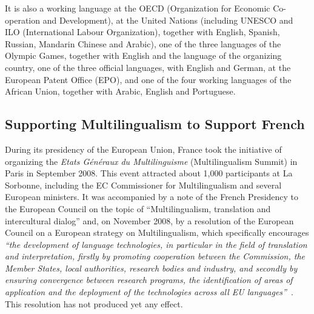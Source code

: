 \begin{multicols}{2}
It is also a working language at the OECD (Organization for Economic
Co-operation and Development), at the United Nations (including UNESCO
and ILO (International Labour Organization), together with English,
Spanish, Russian, Mandarin Chinese and Arabic), one of the three
languages of the Olympic Games, together with English and the language
of the organizing country, one of the three official languages, with
English and German, at the European Patent Office (EPO), and one of
the four working languages of the African Union, together with Arabic,
English and Portuguese.

\subsection{Supporting Multilingualism to Support French}

During its presidency of the European Union, France took the
initiative of organizing the {\em Etats Généraux du Multilinguisme}
(Multilingualism Summit) in Paris in September 2008. This event
attracted about 1,000 participants at La Sorbonne, including the EC
Commissioner for Multilingualism and several European ministers. It
was accompanied by a note of the French Presidency to the European
Council on the topic of ``Multilingualism, translation and
intercultural dialog'' and, on November 2008, by a
resolution of the European Council on a European strategy on
Multilingualism, which specifically encourages {\em ``the development
  of language technologies, in particular in the field of translation
  and interpretation, firstly by promoting cooperation between the
  Commission, the Member States, local authorities, research bodies
  and industry, and secondly by ensuring convergence between research
  programs, the identification of areas of application and the
  deployment of the technologies across all EU languages''}~\cite{eurlex}. This resolution has not produced yet
any effect.


\end{multicols}
